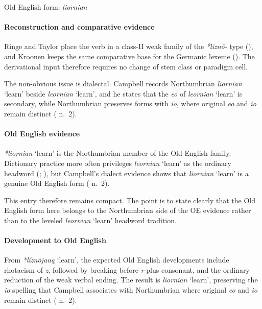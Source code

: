 \documentclass[
  british,
  a4paper,
]{article}
\providecommand{\Recon}[1]{\emph{*#1}}
\begin{document}
Old English form: \emph{liornian}

\paragraph{Reconstruction and comparative
evidence}\label{reconstruction-and-comparative-evidence-37}

Ringe and Taylor place the verb in a class-II weak family of the
\emph{*liznō-} type (), and Kroonen keeps the same comparative base for the Germanic
lexeme (). The derivational
input therefore requires no change of stem class or paradigm cell.

The non-obvious issue is dialectal. Campbell records Northumbrian
\emph{liornian} `learn' beside \emph{leornian} `learn', and he states
that the \emph{eo} of \emph{leornian} `learn' is secondary, while
Northumbrian preserves forms with \emph{io}, where original \emph{eo}
and \emph{io} remain distinct ( n.~2).

\paragraph{Old English evidence}\label{old-english-evidence-37}

\Recon{liornian} `learn' is the Northumbrian member of the Old English
family. Dictionary practice more often privileges \emph{leornian}
`learn' as the ordinary headword (; ), but
Campbell's dialect evidence shows that \emph{liornian} `learn' is a
genuine Old English form ( n.~2).

This entry therefore remains compact. The point is to state clearly that
the Old English form here belongs to the Northumbrian side of the OE
evidence rather than to the leveled \emph{leornian} `learn' headword
tradition.

\paragraph{Development to Old
English}\label{development-to-old-english-37}

From \Recon{líznōjaną} `learn', the expected Old English developments
include rhotacism of \emph{z}, followed by breaking before \emph{r} plus
consonant, and the ordinary reduction of the weak verbal ending. The
result is \emph{liornian} `learn', preserving the \emph{io} spelling
that Campbell associates with Northumbrian where original \emph{eo} and
\emph{io} remain distinct ( n.~2).
\end{document}
